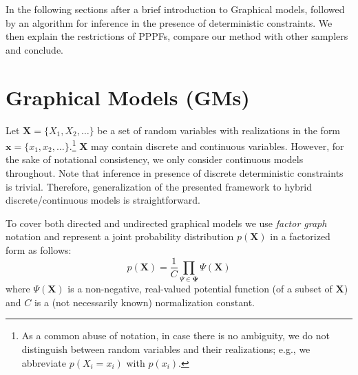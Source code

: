 \documentclass{article}
\renewcommand{\vec}[1]{\mathbf{#1}}
\newcommand{\pr}{p}
\begin{document}
In the following sections after a brief introduction to Graphical models, 
followed by an algorithm for inference in the presence of deterministic constraints.
We then explain the restrictions of PPPFs, compare our method with other samplers and conclude. 

\section{Graphical Models (GMs)}
Let $\vec{X} = \{X_1, X_2, \ldots\}$ be a set of random variables with realizations in the form 
$\vec{x} = \{x_1, x_2, \ldots\}$.\footnote{
As a common abuse of notation, in case there is no ambiguity, we do not distinguish between random variables and their realizations; e.g., we abbreviate $\pr(X_i = x_i)$ with $\pr(x_i)$.}
$\vec{X}$ may contain discrete and continuous variables. 
However, for the sake of notational consistency, %
we only consider continuous models throughout. 
Note that inference in presence of discrete deterministic constraints is trivial.
Therefore, generalization of the presented framework to hybrid discrete/continuous models is straightforward.   

To cover both directed and undirected graphical models we use
\emph{factor graph} notation \cite{kschischang2001factor}
and represent a joint probability distribution $\pr(\vec{X})$ in a factorized form as follows: 
\begin{equation}
\label{e:factor-graph}
\pr(\vec{X}) = \frac{1}{C} \prod_{\Psi \in \boldsymbol\Psi} \Psi (\vec{X})
\end{equation}
where 
$\Psi(\vec{X})$ is a non-negative, real-valued potential function (of a subset of $\vec{X}$) and $C$ is a (not necessarily known) normalization constant.
\end{document}
